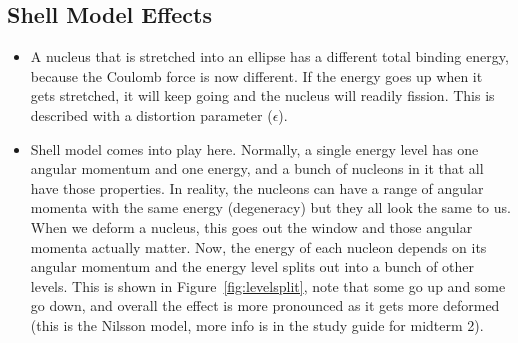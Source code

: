 \documentclass[letter]{article}
\begin{document}
\subsection{Shell Model Effects}

\begin{itemize}
\item A nucleus that is stretched into an ellipse has a different
  total binding energy, because the Coulomb force is now different. If
  the energy goes up when it gets stretched, it will keep going and the
  nucleus will readily fission. This is described with a distortion
  parameter ($\epsilon$). ~\cite[pp. 494]{krane}
\item Shell model comes into play here. Normally, a single energy
  level has one angular momentum and one energy, and a bunch of nucleons
  in it that all have those properties. In reality, the nucleons can
  have a range of angular momenta with the same energy (degeneracy)
  but they all look the same to us. When we deform a nucleus, this
  goes out the window and those
  angular momenta actually matter. Now, the energy of each nucleon
  depends on its angular momentum and the energy level splits out into
  a bunch of other levels. This is shown
  in Figure~\ref{fig:levelsplit}, note that some go up and some go
  down, and overall the effect is more pronounced as it gets more
  deformed (this is the Nilsson model, more info is in the study
  guide for midterm 2).~\cite[pp. 151-153]{lecture}


\end{itemize}
\end{document}
